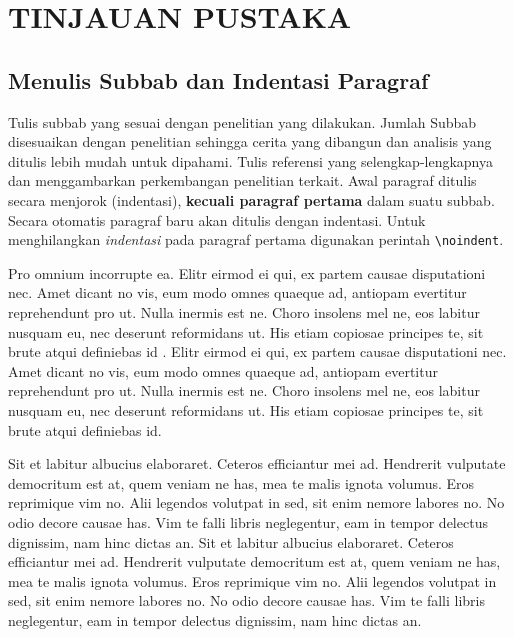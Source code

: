 \chapter{TINJAUAN PUSTAKA}


\section{Menulis Subbab dan Indentasi Paragraf}
Tulis subbab yang sesuai dengan penelitian yang dilakukan. Jumlah Subbab disesuaikan dengan penelitian sehingga cerita yang dibangun dan analisis yang ditulis lebih mudah untuk dipahami. Tulis referensi yang selengkap-lengkapnya dan menggambarkan perkembangan penelitian terkait. Awal paragraf ditulis secara menjorok (indentasi), \textbf{kecuali paragraf pertama} dalam suatu subbab. Secara otomatis paragraf baru akan ditulis dengan indentasi. Untuk menghilangkan \textit{indentasi} pada paragraf pertama digunakan perintah \verb!\noindent!.

Pro omnium incorrupte ea. Elitr eirmod ei qui, ex partem causae disputationi nec. Amet dicant no vis, eum modo omnes quaeque ad, antiopam evertitur reprehendunt pro ut. Nulla inermis est ne. Choro insolens mel ne, eos labitur nusquam eu, nec deserunt reformidans ut. His etiam copiosae principes te, sit brute atqui definiebas id \cite{mumpuni_future_2018}. Elitr eirmod ei qui, ex partem causae disputationi nec. Amet dicant no vis, eum modo omnes quaeque ad, antiopam evertitur reprehendunt pro ut. Nulla inermis est ne. Choro insolens mel ne, eos labitur nusquam eu, nec deserunt reformidans ut. His etiam copiosae principes te, sit brute atqui definiebas id.

Sit et labitur albucius elaboraret. Ceteros efficiantur mei ad. Hendrerit vulputate democritum est at, quem veniam ne has, mea te malis ignota volumus. Eros reprimique vim no. Alii legendos volutpat in sed, sit enim nemore labores no. No odio decore causae has. Vim te falli libris neglegentur, eam in tempor delectus dignissim, nam hinc dictas an. Sit et labitur albucius elaboraret. Ceteros efficiantur mei ad. Hendrerit vulputate democritum est at, quem veniam ne has, mea te malis ignota volumus. Eros reprimique vim no. Alii legendos volutpat in sed, sit enim nemore labores no. No odio decore causae has. Vim te falli libris neglegentur, eam in tempor delectus dignissim, nam hinc dictas an.

